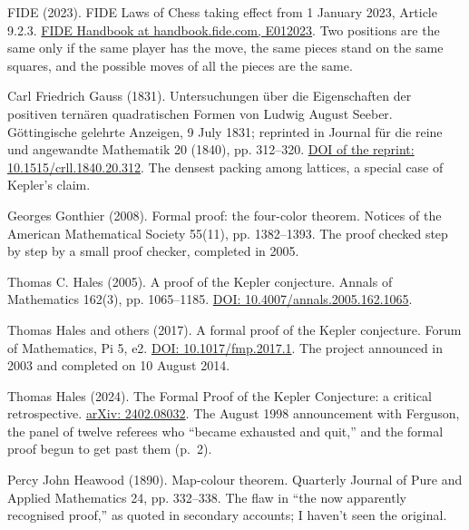 \documentclass[11pt,twoside]{article}
\theoremstyle{thielethm}
\theoremstyle{thieledef}
\theoremstyle{thieledef}
\theoremstyle{thieledef}
\theoremstyle{thielethm}
\theoremstyle{thieleobs}
\theoremstyle{thielethm}
\begin{document}
\noindent FIDE (2023). FIDE Laws of Chess taking effect from 1 January 2023, Article 9.2.3. \href{https://handbook.fide.com/chapter/E012023}{FIDE Handbook at handbook.fide.com, E012023}. Two positions are the same only if the same player has the move, the same pieces stand on the same squares, and the possible moves of all the pieces are the same.
\par\medskip

\noindent Carl Friedrich Gauss (1831). Untersuchungen \"uber die Eigenschaften der positiven tern\"aren quadratischen Formen von Ludwig August Seeber. G\"ottingische gelehrte Anzeigen, 9 July 1831; reprinted in Journal f\"ur die reine und angewandte Mathematik 20 (1840), pp. 312--320. \href{https://doi.org/10.1515/crll.1840.20.312}{DOI of the reprint: 10.1515/crll.1840.20.312}. The densest packing among lattices, a special case of Kepler's claim.
\par\medskip

\noindent Georges Gonthier (2008). Formal proof: the four-color theorem. Notices of the American Mathematical Society 55(11), pp. 1382--1393. The proof checked step by step by a small proof checker, completed in 2005.
\par\medskip

\noindent Thomas C. Hales (2005). A proof of the Kepler conjecture. Annals of Mathematics 162(3), pp. 1065--1185. \href{https://doi.org/10.4007/annals.2005.162.1065}{DOI: 10.4007/annals.2005.162.1065}.
\par\medskip

\noindent Thomas Hales and others (2017). A formal proof of the Kepler conjecture. Forum of Mathematics, Pi 5, e2. \href{https://doi.org/10.1017/fmp.2017.1}{DOI: 10.1017/fmp.2017.1}. The project announced in 2003 and completed on 10 August 2014.
\par\medskip

\noindent Thomas Hales (2024). The Formal Proof of the Kepler Conjecture: a critical retrospective. \href{https://arxiv.org/abs/2402.08032}{arXiv: 2402.08032}. The August 1998 announcement with Ferguson, the panel of twelve referees who ``became exhausted and quit,'' and the formal proof begun to get past them (p.~2).
\par\medskip

\noindent Percy John Heawood (1890). Map-colour theorem. Quarterly Journal of Pure and Applied Mathematics 24, pp. 332--338. The flaw in ``the now apparently recognised proof,'' as quoted in secondary accounts; I haven't seen the original.
\par\medskip
\end{document}
